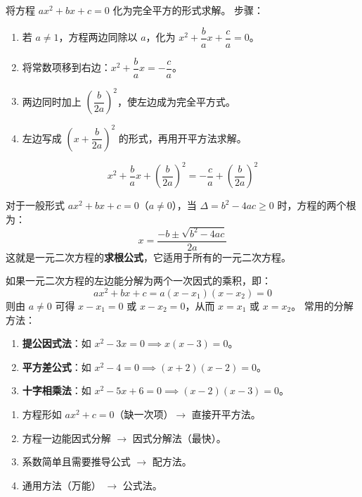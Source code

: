 \documentclass[12pt, a4paper]{ctexart}
\begin{document}
\begin{knowledgebox}
将方程 $ax^2+bx+c=0$ 化为完全平方的形式求解。
\medskip
步骤：
\begin{enumerate}[leftmargin=*]
  \item 若 $a \neq 1$，方程两边同除以 $a$，化为 $x^2 + \dfrac{b}{a}x + \dfrac{c}{a} = 0$。
  \item 将常数项移到右边：$x^2 + \dfrac{b}{a}x = -\dfrac{c}{a}$。
  \item 两边同时加上 $\left(\dfrac{b}{2a}\right)^2$，使左边成为完全平方式。
  \item 左边写成 $\left(x + \dfrac{b}{2a}\right)^2$ 的形式，再用开平方法求解。
\end{enumerate}
\[
\boxed{x^2 + \frac{b}{a}x + \left(\frac{b}{2a}\right)^2 = -\frac{c}{a} + \left(\frac{b}{2a}\right)^2}
\]
\end{knowledgebox}

\begin{knowledgebox}
对于一般形式 $ax^2+bx+c=0$（$a\neq 0$），当 $\Delta = b^2-4ac \geqslant 0$ 时，方程的两个根为：
\[
\boxed{x = \frac{-b \pm \sqrt{b^2-4ac}}{2a}}
\]
这就是一元二次方程的\textbf{求根公式}，它适用于所有的一元二次方程。
\end{knowledgebox}

\begin{knowledgebox}
如果一元二次方程的左边能分解为两个一次因式的乘积，即：
\[
ax^2+bx+c = a(x-x_1)(x-x_2) = 0
\]
则由 $a \neq 0$ 可得 $x - x_1 = 0$ 或 $x - x_2 = 0$，从而 $x = x_1$ 或 $x = x_2$。
\medskip
常用的分解方法：
\begin{enumerate}[leftmargin=*]
  \item \textbf{提公因式法}：如 $x^2-3x = 0 \implies x(x-3)=0$。
  \item \textbf{平方差公式}：如 $x^2-4=0 \implies (x+2)(x-2)=0$。
  \item \textbf{十字相乘法}：如 $x^2-5x+6=0 \implies (x-2)(x-3)=0$。
\end{enumerate}
\end{knowledgebox}

\begin{tipbox}[解法选择策略]
\begin{enumerate}[leftmargin=*]
  \item 方程形如 $ax^2+c=0$（缺一次项）$\longrightarrow$ 直接开平方法。
  \item 方程一边能因式分解 $\longrightarrow$ 因式分解法（最快）。
  \item 系数简单且需要推导公式 $\longrightarrow$ 配方法。
  \item 通用方法（万能） $\longrightarrow$ 公式法。
\end{enumerate}
\end{tipbox}
\end{document}
